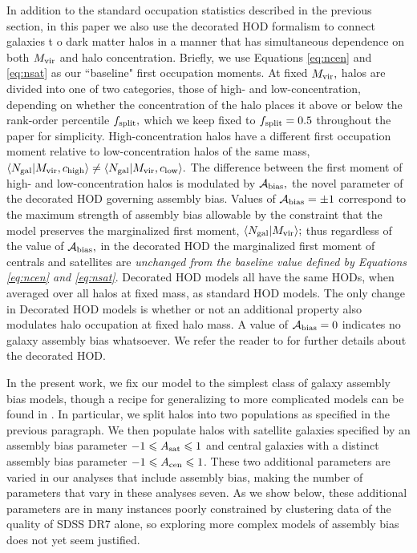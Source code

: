\documentclass[usenatbib,usegraphicx,letterpaper]{mn2e}
\newcommand{\mvir}{M_{\rm vir}}
\newcommand{\ngal}{N_{\rm gal}}
\newcommand{\abias}{\mathcal{A}_{\rm bias}}
\begin{document}
In addition to the standard occupation statistics described in the previous section, 
in this paper we also use the decorated HOD formalism to connect galaxies t
o dark matter halos in a manner that has simultaneous dependence on both $\mvir$ and halo concentration. 
Briefly, we use Equations \ref{eq:ncen} and \ref{eq:nsat} as our ``baseline" first occupation moments. 
At fixed $\mvir,$ halos are divided into one of two categories, those of high- and low-concentration, 
depending on whether the concentration of the halo places it above or below the rank-order percentile 
$f_{\rm split},$ which we keep fixed to $f_{\rm split}=0.5$ throughout the paper for simplicity. 
High-concentration halos have a different first occupation moment relative to low-concentration 
halos of the same mass, $\langle\ngal|\mvir, c_{\rm high}\rangle \neq \langle\ngal|\mvir, c_{\rm low}\rangle.$ The difference between the first moment of high- and low-concentration halos is modulated by $\abias,$ the novel parameter of the decorated HOD governing assembly bias. Values of $\abias=\pm1$ correspond to the maximum strength of assembly bias allowable by the constraint that the model preserves the marginalized first moment, $\langle\ngal|\mvir\rangle;$ thus regardless of the value of $\abias,$ in the decorated HOD the marginalized first moment of centrals and satellites are {\em unchanged from the baseline value defined by Equations \ref{eq:ncen} and \ref{eq:nsat}}. 
Decorated HOD models all have the same HODs, when averaged over all halos at fixed mass, as standard HOD models. The only 
change in Decorated HOD models is whether or not an additional property also modulates halo occupation at fixed halo mass. A 
value of $\abias = 0$ indicates no galaxy assembly bias whatsoever. We refer the reader to \citet{hearin_etal16} for 
further details about the decorated HOD. 

In the present work, we fix our model to the simplest class of galaxy assembly bias models, though a recipe for 
generalizing to more complicated models can be found in \citet{hearin_etal16}. In particular, we split halos into 
two populations as specified in the previous paragraph. We then populate halos with satellite galaxies specified 
by an assembly bias parameter $-1 \le A_{\rm sat} \le 1$ and central galaxies with a distinct assembly bias 
parameter $-1 \le A_{\rm cen} \le 1$. These two additional parameters are varied in our analyses that include 
assembly bias, making the number of parameters that vary in these analyses seven. As we show below, 
these additional parameters are in many instances poorly constrained by clustering data of the quality of 
SDSS DR7 alone, so exploring more complex models of assembly bias does not yet seem justified.
\end{document}
